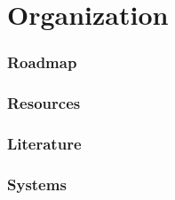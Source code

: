\part{Organization}
\section{Roadmap}

\section{Resources}

\section{Literature}


\section{Systems}

%
